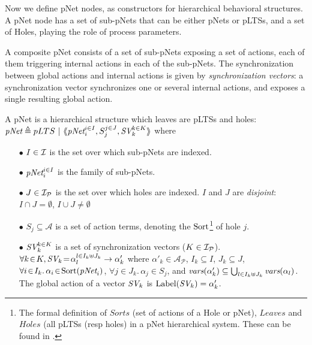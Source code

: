\documentclass{lncs/llncs}
\def\AlgA{\mathcal{A}}
\renewcommand{\P}{\mathcal P}
\begin{document}
Now we define
pNet nodes, as constructors for hierarchical behavioral structures.
A pNet node has a set of sub-pNets that can be either pNets or pLTSs, and a
set of Holes, playing the role of process parameters.

A composite pNet consists of a set of sub-pNets exposing
a set of actions, each of them triggering internal actions in each of
the sub-pNets. The synchronization between global actions and
internal actions is given by  \emph{synchronization vectors}: a
synchronization vector synchronizes one or several internal actions, and
exposes a single resulting global action.


\begin{definition}[pNets]\label{def-pnets}
A pNet is a hierarchical structure which leaves are pLTSs and holes:\\
$\pNet\triangleq pLTS~|~\mylangle \pNet_i^{i\in I}, S_j^{j\in J}, \symb{SV}_k^{k\in K}\myrangle$
where
\begin{itemize}
\item[$\bullet$] $I \in \mathcal{I}$ is the set over which sub-pNets are indexed.
\item[$\bullet$] $\pNet_i^{i\in I}$ is the family of sub-pNets.

\item[$\bullet$] $J\in\I_\P$ is the set over which holes are indexed.
$I$ and $J$ are \emph{disjoint}: $I\cap J=\emptyset$,  $I\cup J\neq\emptyset$

\item[$\bullet$] $S_j \subseteq \AlgA$ is a set of action terms,
  denoting the $\operatorname{Sort}$\footnote{The formal definition of $Sorts$ (set of actions of a Hole
  or pNet), $Leaves$ and $Holes$ (all pLTSs (resp holes) in a pNet
  hierarchical system. These can be found in \cite{henrio:Forte2016}.}
  of hole $j$. 

\item[$\bullet$] $\symb{SV}_k^{k\in K}$ is a set of
  synchronization vectors ($K\in\I_\P$). $\forall k\!\in\! K,
  \symb{SV}_k\!=\!\alpha_{l}^{l\in I_k \uplus J_k}\to\alpha'_k$ where
  $\alpha'_k\in \mathcal{A}_\P$, $I_k\subseteq I$, $J_k\subseteq J$,
  $\forall i\!\in\! I_k.\,\alpha_{i}\!\in\!\Sort(\pNet_i)$,
  $\forall j\!\in\!
  J_k.\,\alpha_{j}\!\in\!S_j$, and $\vars(\alpha'_k)\subseteq \bigcup_{l\in I_k\uplus 
  J_k}{\vars({\alpha_l})}$. The global action of a vector $\symb{SV}_k$ is
$\Label(\symb{SV}_k) = \alpha'_k$.


\end{itemize}
\end{definition}
\end{document}
